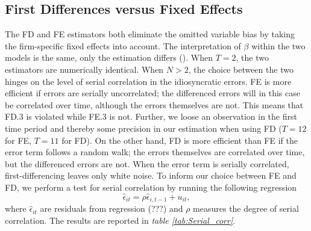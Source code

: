\documentclass[11pt]{article}
\begin{document}
\subsection{First Differences versus Fixed Effects}
The FD and FE estimators both eliminate the omitted variable bias by taking the firm-specific fixed effects into account. The interpretation of $\beta$ within the two models is the same, only the estimation differs (\cite{Wooldrige_2010_10}). When $T=2$, the two estimators are numerically identical. When $N>2$, the choice between the two hinges on the level of serial correlation in the idiosyncratic errors. FE is more efficient if errors are serially uncorrelated; the differenced errors will in this case be correlated over time, although the errors themselves are not. This means that FD.3 is violated while FE.3 is not. Further, we loose an observation in the first time period and thereby some precision in our estimation when using FD ($T=12$ for FE, $T=11$ for FD). 
On the other hand, FD is more efficient than FE if the error term follows a random walk; the errors themselves are correlated over time, but the differenced errors are not. When the error term is serially correlated, first-differencing leaves only white noise.
To inform our choice between FE and FD, we perform a test for serial correlation by running the following regression 
\begin{equation}
    \widehat{\epsilon}_{it}= \rho\widehat{\epsilon}_{i,t-1}+u_{it},
\end{equation}
where $\widehat{\epsilon}_{it}$ are residuals from regression (???) and $\rho$ measures the degree of serial correlation. 
The results are reported in \textit{table \ref{tab:Serial_corr}}.
\end{document}

